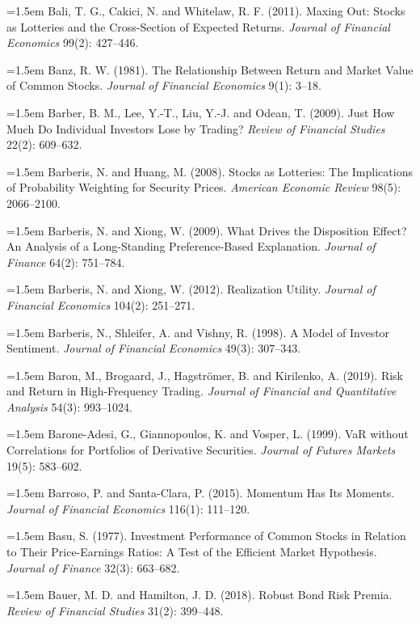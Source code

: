 \hangindent=1.5em Bali, T. G., Cakici, N. and Whitelaw, R. F. (2011). Maxing Out: Stocks as Lotteries and the Cross-Section of Expected Returns. \emph{Journal of Financial Economics} 99(2): 427--446.

\hangindent=1.5em Banz, R. W. (1981). The Relationship Between Return and Market Value of Common Stocks. \emph{Journal of Financial Economics} 9(1): 3--18.

\hangindent=1.5em Barber, B. M., Lee, Y.-T., Liu, Y.-J. and Odean, T. (2009). Just How Much Do Individual Investors Lose by Trading? \emph{Review of Financial Studies} 22(2): 609--632.

\hangindent=1.5em Barberis, N. and Huang, M. (2008). Stocks as Lotteries: The Implications of Probability Weighting for Security Prices. \emph{American Economic Review} 98(5): 2066--2100.

\hangindent=1.5em Barberis, N. and Xiong, W. (2009). What Drives the Disposition Effect? An Analysis of a Long-Standing Preference-Based Explanation. \emph{Journal of Finance} 64(2): 751--784.

\hangindent=1.5em Barberis, N. and Xiong, W. (2012). Realization Utility. \emph{Journal of Financial Economics} 104(2): 251--271.

\hangindent=1.5em Barberis, N., Shleifer, A. and Vishny, R. (1998). A Model of Investor Sentiment. \emph{Journal of Financial Economics} 49(3): 307--343.

\hangindent=1.5em Baron, M., Brogaard, J., Hagstr\"omer, B. and Kirilenko, A. (2019). Risk and Return in High-Frequency Trading. \emph{Journal of Financial and Quantitative Analysis} 54(3): 993--1024.

\hangindent=1.5em Barone-Adesi, G., Giannopoulos, K. and Vosper, L. (1999). VaR without Correlations for Portfolios of Derivative Securities. \emph{Journal of Futures Markets} 19(5): 583--602.

\hangindent=1.5em Barroso, P. and Santa-Clara, P. (2015). Momentum Has Its Moments. \emph{Journal of Financial Economics} 116(1): 111--120.

\hangindent=1.5em Basu, S. (1977). Investment Performance of Common Stocks in Relation to Their Price-Earnings Ratios: A Test of the Efficient Market Hypothesis. \emph{Journal of Finance} 32(3): 663--682.

\hangindent=1.5em Bauer, M. D. and Hamilton, J. D. (2018). Robust Bond Risk Premia. \emph{Review of Financial Studies} 31(2): 399--448.

